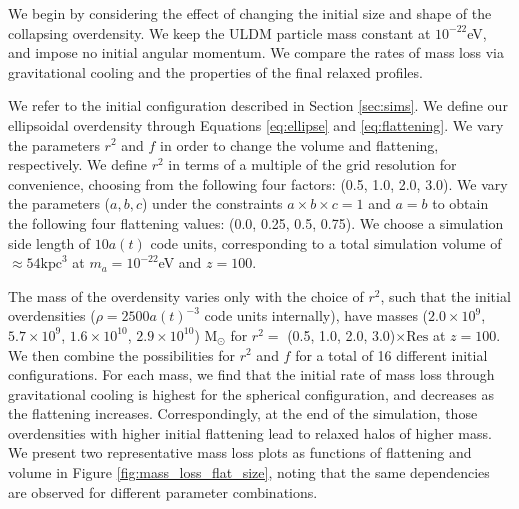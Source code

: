 \documentclass[a4paper,11pt]{article}
\begin{document}
We begin by considering the effect of changing the initial size and shape of the collapsing overdensity. We keep the ULDM particle mass constant at $10^{-22}$eV, and impose no initial angular momentum. We compare the rates of mass loss via gravitational cooling and the properties of the final relaxed profiles. 

We refer to the initial configuration described in Section \ref{sec:sims}. We define our ellipsoidal overdensity through Equations \ref{eq:ellipse} and \ref{eq:flattening}. We vary the parameters $r^2$ and $f$ in order to change the volume and flattening, respectively. We define $r^2$ in terms of a multiple of the grid resolution for convenience, choosing from the following four factors: (0.5, 1.0, 2.0, 3.0). We vary the parameters ($a, b, c$) under the constraints $a \times b \times c = 1$ and $a = b$ to obtain the following four flattening values: (0.0, 0.25, 0.5, 0.75). We choose a simulation side length of $10a(t)$ code units, corresponding to a total simulation volume of $\approx54 \mathrm{kpc}^3$ at $m_a = 10^{-22}$eV and $z=100$.

The mass of the overdensity varies only with the choice of $r^2$, such that the initial overdensities ($\rho = 2500a(t)^{-3}$ code units internally), have masses ($2.0\times 10^9$, $5.7\times 10^9$, $1.6\times 10^{10}$, $2.9\times 10^{10}$) M$_\odot$ for $r^2 =  $ (0.5, 1.0, 2.0, 3.0)$\times \mathrm{Res}$ at  $z=100$. We then combine the possibilities for $r^2$ and $f$ for a total of 16 different initial configurations. For each mass, we find that the initial rate of mass loss through gravitational cooling is highest for the spherical configuration, and decreases as the flattening increases. Correspondingly, at the end of the simulation, those overdensities with higher initial flattening lead to relaxed halos of higher mass. We present two representative mass loss plots as functions of flattening and volume in Figure \ref{fig:mass_loss_flat_size}, noting that the same dependencies are observed for different parameter combinations.
\end{document}
